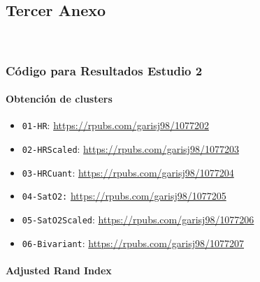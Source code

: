 \subsection{Tercer Anexo}~\label{sec:anexo3}

\subsubsection{Código para Resultados Estudio 2}

\paragraph{Obtención de clusters}

\begin{itemize}
    \item \texttt{01-HR}: \url{https://rpubs.com/garisj98/1077202}
    \item \texttt{02-HRScaled}: \url{https://rpubs.com/garisj98/1077203}
    \item \texttt{03-HRCuant}: \url{https://rpubs.com/garisj98/1077204}
    \item \texttt{04-SatO2:} \url{https://rpubs.com/garisj98/1077205}
    \item \texttt{05-SatO2Scaled}: \url{https://rpubs.com/garisj98/1077206}
    \item \texttt{06-Bivariant}: \url{https://rpubs.com/garisj98/1077207}
\end{itemize}

\paragraph{Adjusted Rand Index}

